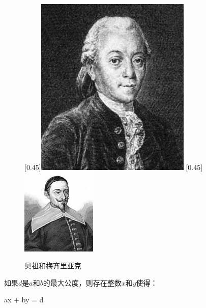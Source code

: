 \documentclass[b5paper]{ctexart}
\begin{document}
\begin{figure}[htbp]
 \centering
 [0.45\linewidth]{\includegraphics[scale=0.45]{img/Bezout}}
 [0.45\linewidth]{\includegraphics[scale=0.95]{img/Meziriac}}
 \caption{贝祖和梅齐里亚克}
\end{figure}

\begin{theorem}[贝祖等式]
如果$d$是$a$和$b$的最大公度，则存在整数$x$和$y$使得：

\be
ax + by = d
\label{eq:bezouts-identity}
\ee
\end{theorem}
\end{document}
